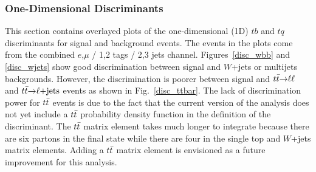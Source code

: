 \subsubsection{One-Dimensional Discriminants}

This section contains overlayed plots of the one-dimensional (1D) $tb$
and $tq$ discriminants for signal and background events. The events in
the plots come from the combined $e$,$\mu$ / 1,2 tags / 2,3 jets
channel. Figures~\ref{disc_wbb} and \ref{disc_wjets} show good
discrimination between signal and $W$+jets or multijets backgrounds.
However, the discrimination is poorer between signal and $\mbox{${\mbox{$t\bar{t}$}}{\rightarrow}\ell\ell$}$
and $\mbox{${\mbox{$t\bar{t}$}}{\rightarrow}\ell$+jets}$ events as shown in Fig.~\ref{disc_ttbar}. The lack of
discrimination power for $\mbox{$t\bar{t}$}$ events is due to the fact that the
current version of the analysis does not yet include a $\mbox{$t\bar{t}$}$
probability density function in the definition of the discriminant.
The $\mbox{$t\bar{t}$}$ matrix element takes much longer to integrate because
there are six partons in the final state while there are four in the
single top and $W$+jets matrix elements. Adding a $\mbox{$t\bar{t}$}$ matrix
element is envisioned as a future improvement for this analysis.

